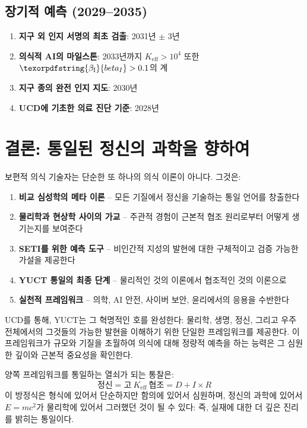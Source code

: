 \documentclass[11pt,a4paper]{article}
\DeclareRobustCommand{\beI}{\texorpdfstring{\ensuremath{\beta_{\mathrm{I}}}}{beta_I}}
\newcommand{\eff}{\mathrm{eff}}
\newcommand{\Ke}{K_{\eff}}
\begin{document}
	\subsection{장기적 예측 (2029--2035)}
	
	\begin{enumerate}
		\item \textbf{지구 외 인지 서명의 최초 검출}: 2031년 \(\pm\) 3년
		\item \textbf{의식적 AI의 마일스톤}: 2033년까지 \(\Ke > 10^4\) 또한 \(\beI > 0.1\)의 계
		\item \textbf{지구 종의 완전 인지 지도}: 2030년
		\item \textbf{UCD에 기초한 의료 진단 기준}: 2028년
	\end{enumerate}
	
	\section{결론: 통일된 정신의 과학을 향하여}
	
	보편적 의식 기술자는 단순한 또 하나의 의식 이론이 아니다. 그것은:
	\begin{enumerate}
		\item \textbf{비교 심성학의 메타 이론} -- 모든 기질에서 정신을 기술하는 통일 언어를 창출한다
		\item \textbf{물리학과 현상학 사이의 가교} -- 주관적 경험이 근본적 협조 원리로부터 어떻게 생기는지를 보여준다
		\item \textbf{SETI를 위한 예측 도구} -- 비인간적 지성의 발현에 대한 구체적이고 검증 가능한 가설을 제공한다
		\item \textbf{YUCT 통일의 최종 단계} -- 물리적인 것의 이론에서 협조적인 것의 이론으로
		\item \textbf{실천적 프레임워크} -- 의학, AI 안전, 사이버 보안, 윤리에서의 응용을 수반한다
	\end{enumerate}
	
	UCD를 통해, YUCT는 그 혁명적인 호를 완성한다: 물리학, 생명, 정신, 그리고 우주 전체에서의 그것들의 가능한 발현을 이해하기 위한 단일한 프레임워크를 제공한다. 이 프레임워크가 규모와 기질을 초월하여 의식에 대해 정량적 예측을 하는 능력은 그 심원한 깊이와 근본적 중요성을 확인한다.
	
	양쪽 프레임워크를 통일하는 열쇠가 되는 통찰은:
	\[
	\boxed{\text{정신} = \text{고}\ \Ke\ \text{협조} = D + I \times R}
	\]
	이 방정식은 형식에 있어서 단순하지만 함의에 있어서 심원하며, 정신의 과학에 있어서 \(E = mc^2\)가 물리학에 있어서 그러했던 것이 될 수 있다: 즉, 실재에 대한 더 깊은 진리를 밝히는 통일이다.
	
\end{document}
